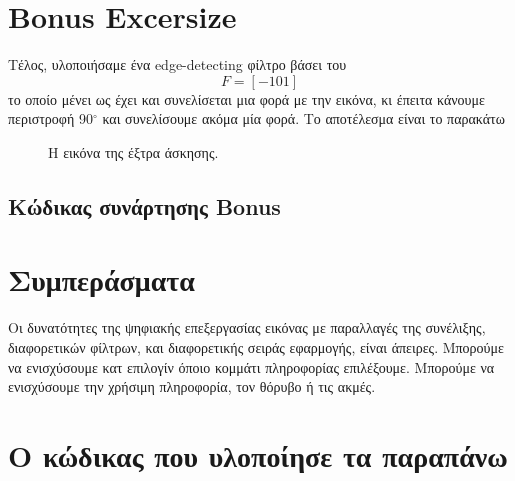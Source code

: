\documentclass[11pt]{scrartcl} %
\begin{document}

\clearpage
\section{Bonus Excersize}

Τέλος, υλοποιήσαμε ένα edge-detecting φίλτρο βάσει του \[ F = [-1 0 1]\] το οποίο μένει ως έχει και συνελίσεται μια φορά με την εικόνα,
κι έπειτα κάνουμε περιστροφή 90$^{\circ}$ και συνελίσουμε ακόμα μία φορά. Το αποτέλεσμα είναι το παρακάτω

\begin{figure}[h]
    \centering
    \caption{Η εικόνα της έξτρα άσκησης.}
\end{figure}

\clearpage
\subsection*{Κώδικας συνάρτησης Bonus}



\section{Συμπεράσματα}
Οι δυνατότητες της ψηφιακής επεξεργασίας εικόνας με παραλλαγές της συνέλιξης, διαφορετικών φίλτρων, και διαφορετικής σειράς
εφαρμογής, είναι άπειρες. Μπορούμε να ενισχύσουμε κατ επιλογίν όποιο κομμάτι πληροφορίας επιλέξουμε. Μπορούμε να ενισχύσουμε
την χρήσιμη πληροφορία, τον θόρυβο ή τις ακμές.


\section{Ο κώδικας που υλοποίησε τα παραπάνω}






\end{document}
